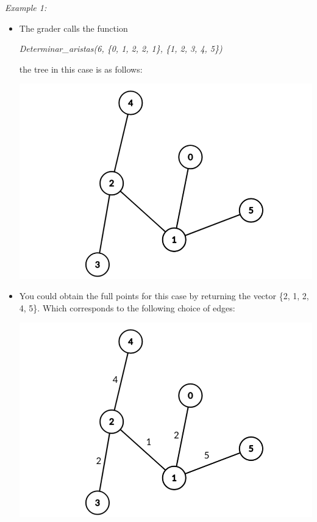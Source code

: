 \documentclass[12pt]{scrartcl}
\begin{document}
        {\itshape Example 1:}
        \begin{itemize}
            \item The grader calls the function 
            \begin{center}
                \textit{Determinar\_aristas(6, \{0, 1, 2, 2, 1\}, \{1, 2, 3, 4, 5\})}
            \end{center}
            the tree in this case is as follows:
            \begin{center}
                \includegraphics[scale=0.25]{ej1.png}
            \end{center}
            \item You could obtain the full points for this case by returning the vector \{2, 1, 2, 4, 5\}. Which corresponds to the following choice of edges:
            \begin{center}
                \includegraphics[scale=0.25]{ej2.png}

\end{center}
\end{itemize}
\end{document}
